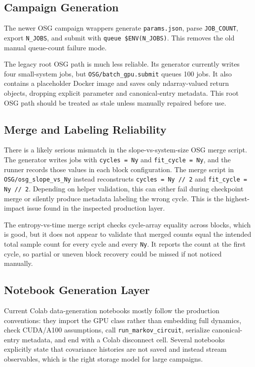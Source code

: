 \documentclass[aps,prb,onecolumn,nofootinbib,superscriptaddress]{revtex4-2}
\begin{document}
\subsection{Campaign Generation}

The newer OSG campaign wrappers generate \texttt{params.json}, parse
\texttt{JOB\_COUNT}, export \texttt{N\_JOBS}, and submit with
\texttt{queue \$ENV(N\_JOBS)}.  This removes the old manual queue-count failure
mode.

The legacy root OSG path is much less reliable.  Its generator currently writes
four small-system jobs, but \texttt{OSG/batch\_gpu.submit} queues 100 jobs.  It
also contains a placeholder Docker image and saves only ndarray-valued return
objects, dropping explicit parameter and canonical-entry metadata.  This root OSG
path should be treated as stale unless manually repaired before use.

\subsection{Merge and Labeling Reliability}

There is a likely serious mismatch in the slope-vs-system-size OSG merge script.
The generator writes jobs with \texttt{cycles = Ny} and \texttt{fit\_cycle = Ny},
and the runner records those values in each block configuration.  The merge
script in \texttt{OSG/osg\_slope\_vs\_Ny} instead reconstructs
\texttt{cycles = Ny // 2} and \texttt{fit\_cycle = Ny // 2}.  Depending on helper
validation, this can either fail during checkpoint merge or silently produce
metadata labeling the wrong cycle.  This is the highest-impact issue found in the
inspected production layer.

The entropy-vs-time merge script checks cycle-array equality across blocks, which
is good, but it does not appear to validate that merged counts equal the intended
total sample count for every cycle and every \texttt{Ny}.  It reports the count at
the first cycle, so partial or uneven block recovery could be missed if not
noticed manually.

\subsection{Notebook Generation Layer}

Current Colab data-generation notebooks mostly follow the production conventions:
they import the GPU class rather than embedding full dynamics, check CUDA/A100
assumptions, call \texttt{run\_markov\_circuit}, serialize canonical-entry
metadata, and end with a Colab disconnect cell.  Several notebooks explicitly
state that covariance histories are not saved and instead stream observables,
which is the right storage model for large campaigns.
\end{document}
